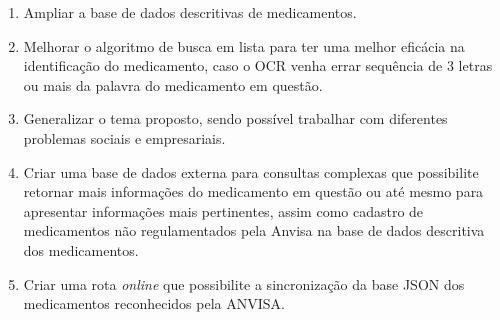 \begin{enumerate}
\item Ampliar a base de dados descritivas de medicamentos.

  \item Melhorar o algoritmo de busca em lista para ter uma melhor eficácia na identificação do medicamento, caso o OCR venha errar sequência de 3 letras ou mais da palavra do medicamento em questão.
  \item Generalizar o tema proposto, sendo possível trabalhar com diferentes problemas sociais e empresariais.
  \item Criar uma base de dados externa para consultas complexas que possibilite retornar mais informações do medicamento em questão ou até mesmo para apresentar informações mais pertinentes, assim como cadastro de medicamentos não regulamentados pela Anvisa na base de dados descritiva dos medicamentos.
  \item Criar uma rota \textit{online} que possibilite a sincronização da base JSON dos medicamentos reconhecidos pela ANVISA.
\end{enumerate}


